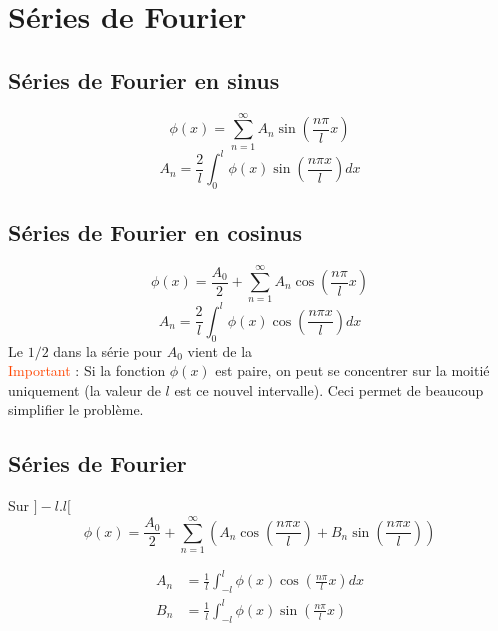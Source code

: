 \documentclass[resume]{subfiles}
\begin{document}
\section{Séries de Fourier}
\subsection{Séries de Fourier en sinus}
$$\boxed{\phi(x)=\sum_{n=1}^{\infty}A_n\sin\left(\frac{n\pi}{l}x\right)}$$
$$\boxed{A_n=\frac{2}{l}\int_{0}^{l}\phi(x)\sin\left(\frac{n\pi x}{l}\right)dx}$$
\subsection{Séries de Fourier en cosinus}
$$\boxed{\phi(x)=\frac{A_0}{2}+\sum_{n=1}^{\infty}A_n\cos\left(\frac{n\pi}{l}x\right)}$$
$$\boxed{A_n=\frac{2}{l}\int_{0}^{l}\phi(x)\cos\left(\frac{n\pi x}{l}\right)dx}$$
Le $1/2$ dans la série pour $A_0$ vient de la\\
\textcolor{OrangeRed}{Important} : Si la fonction $\phi(x)$ est paire, on peut se concentrer sur la moitié uniquement (la valeur de $l$ est ce nouvel intervalle). Ceci permet de beaucoup simplifier le problème.
\subsection{Séries de Fourier}
Sur $]-l.l[$
$$\boxed{\phi(x)=\frac{A_0}{2}+\sum_{n=1}^{\infty}\left(A_n\cos\left(\frac{n\pi x}{l}\right)+B_n\sin\left(\frac{n\pi x}{l}\right)\right)}$$

\begin{align*}
A_n &= \frac{1}{l}\int_{-l}^{l}\phi(x)\cos\left(\frac{n\pi}{l}x\right)dx\\
B_n &=\frac{1}{l}\int_{-l}^{l}\phi(x)\sin\left(\frac{n\pi}{l}x\right)
\end{align*}
\end{document}
